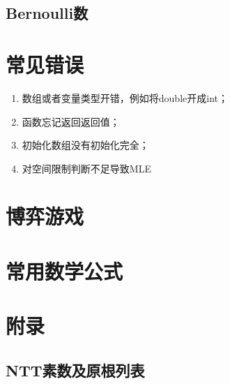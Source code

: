 \documentclass[landscape, oneside, a4paper, cs4size]{book}
\begin{document}
\begin{multicols}{2}
\begin{spacing}{0.72}
\begin{spacing}{0.50}
\begin{spacing}{0.5}
						\subsection*{Bernoulli数}
						
					\end{spacing}
					\section{常见错误}\footnotesize
					\begin{enumerate}
						\item 数组或者变量类型开错，例如将double开成int；
						\item 函数忘记返回返回值；
						\item 初始化数组没有初始化完全；
						\item 对空间限制判断不足导致MLE
					\end{enumerate}
					\section{博弈游戏}\footnotesize
					
					\section{常用数学公式}\footnotesize
					
	\end{spacing}
		\section{附录}
		\subsection*{NTT素数及原根列表}
		
	\end{spacing}
	\end{multicols}
\end{document}
